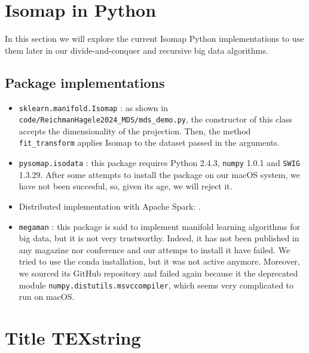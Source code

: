 \documentclass[a4paper,12pt]{article}
\begin{document}
\pagebreak
\section{Isomap in Python}

In this section we will explore the current Isomap Python implementations to use them later in our divide-and-conquer and recursive big data algorithms.

\subsection{Package implementations}

\begin{itemize}
    \item \texttt{sklearn.manifold.Isomap} \cite{pedregosa2011scikit}: as shown in  \nolinkurl{code/ReichmanHagele2024_MDS/mds_demo.py}, the constructor of this class accepts the dimensionality of the projection.  Then, the method \nolinkurl{fit_transform} applies Isomap to the dataset passed in the arguments.

    \item \texttt{pysomap.isodata} \cite{spiwokv2007}: this package requires Python 2.4.3, \texttt{numpy} 1.0.1 and \texttt{SWIG} 1.3.29. After some attempts to install the package on our macOS system, we have not been succesful, so, given its age, we will reject it.

    \item Distributed implementation with Apache Spark: \cite{Isomap_ApacheSpark}.

    \item \texttt{megaman} \cite{mcqueen2016megamanmanifoldlearningmillions}: this package is said to implement manifold learning algorithms for big data, but it is not very trustworthy. Indeed, it has not been published in any magazine nor conference and our attemps to install it have failed. We tried to use the conda installation, but it was not active anymore. Moreover, we sourced its GitHub repository and failed again because it the deprecated module \texttt{numpy.distutils.msvccompiler}, which seems very complicated to run on macOS.
\end{itemize}



\pagebreak
\section{Title \texorpdfstring{TEXstring}{}}
\label{sec:}
\end{document}
